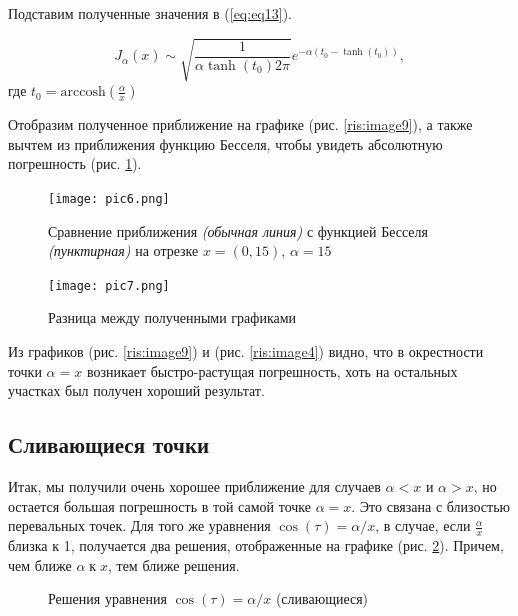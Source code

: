 \documentclass[14pt]{extarticle}
\newcommand{\arccosh}{\mathrm{arccosh}}
\begin{document}
Подставим полученные значения в (\ref{eq:eq13}).

\begin{equation}\label{eq:eq20}
J_\alpha(x) \sim \sqrt{\frac{1}{\alpha \tanh(t_0) 2 \pi}} e^{-\alpha(t_0 - \tanh(t_0))},
\end{equation}
где $t_0 = \arccosh(\frac{\alpha}{x})$

Отобразим полученное приближение на графике (рис. \ref{ris:image9}), а также вычтем из приближения функцию Бесселя, чтобы увидеть абсолютную погрешность (рис. \ref{ris:image11}).

\begin{figure}[h]
	\begin{center}
		\begin{minipage}[h]{0.45\linewidth}
			\texttt{[image: pic6.png]}
			\caption{Сравнение приближения \textit{(обычная линия)} с функцией Бесселя \textit{(пунктирная)} на отрезке $x=(0,15)$, $\alpha=15$} %
			\label{ris:image9} %
		\end{minipage}
		\hfill 
		\begin{minipage}[h]{0.45\linewidth}
			\texttt{[image: pic7.png]}
			\caption{Разница между полученными графиками}
			\label{ris:image11}
		\end{minipage}
	\end{center}
\end{figure}

Из графиков (рис. \ref{ris:image9}) и (рис. \ref{ris:image4}) видно, что в окрестности точки $\alpha=x$ возникает быстро-растущая погрешность, хоть на остальных участках был получен хороший результат.

\subsection{Сливающиеся точки}
Итак, мы получили очень хорошее приближение для случаев $\alpha<x$ и $\alpha>x$, но остается большая погрешность в той самой точке $\alpha = x$. Это связана с близостью перевальных точек.\cite{Fedoryuk} Для того же уравнения $\cos(\tau)=\alpha / x$, в случае, если $\frac{\alpha}{x}$ близка к 1, получается два решения, отображенные на графике (рис. \ref{ris:image6}). Причем, чем ближе $\alpha\;к\;x$, тем ближе решения.

\begin{figure}[h]
	\caption{Решения уравнения $\cos(\tau)=\alpha / x$ (сливающиеся)}
	\label{ris:image6}
\end{figure}
\end{document}
